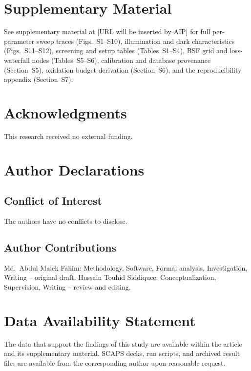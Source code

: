 \documentclass[aip,jap,amsmath,amssymb,preprint]{revtex4-2}
\begin{document}
\section{Supplementary Material}
See supplementary material at [URL will be inserted by AIP] for full per-parameter sweep traces (Figs.~S1--S10), illumination and dark characteristics (Figs.~S11--S12), screening and setup tables (Tables~S1--S4), BSF grid and loss-waterfall nodes (Tables~S5--S6), calibration and database provenance (Section~S5), oxidation-budget derivation (Section~S6), and the reproducibility appendix (Section~S7).

\section{Acknowledgments}
This research received no external funding.

\section{Author Declarations}
\subsection{Conflict of Interest}
The authors have no conflicts to disclose.
\subsection{Author Contributions}
Md.\ Abdul Malek Fahim: Methodology, Software, Formal analysis, Investigation, Writing -- original draft. Hussain Touhid Siddiquee: Conceptualization, Supervision, Writing -- review and editing.

\section{Data Availability Statement}
The data that support the findings of this study are available within the article and its supplementary material. SCAPS decks, run scripts, and archived result files are available from the corresponding author upon reasonable request.
\end{document}
